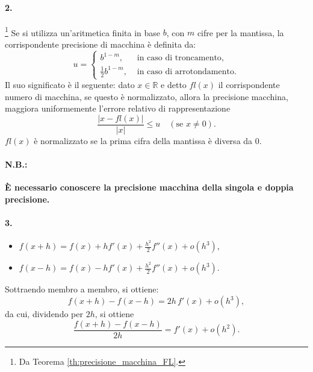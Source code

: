 \paragraph{2.} \footnote{Da Teorema \ref{th:precisione_macchina_FL}.} Se si utilizza un'aritmetica finita in base $b$, con $m$ cifre per la mantissa, la corrispondente precisione di macchina è definita da:
\begin{equation*}
	u=
	\begin{cases}
		b^{1-m}, &\text{ in caso di troncamento},\\
		\frac{1}{2}b^{1-m}, &\text{ in caso di arrotondamento}.
	\end{cases}
\end{equation*}
Il suo significato è il seguente: dato $x\in\mathbb R$ e detto $fl(x)$ il corrispondente numero di macchina, se questo è normalizzato, allora la precisione macchina, maggiora uniformemente l'errore relativo di rappresentazione
\begin{equation*}
	\frac{|x-fl(x)|}{|x|}\leq u\quad (\text{se } x\neq 0).
\end{equation*}
$fl(x)$ è normalizzato se la prima cifra della mantissa è diversa da 0.

\paragraph{N.B.:} \textbf{È necessario conoscere la precisione macchina della singola e doppia precisione.}

\paragraph{3.}
\begin{itemize}
	\item $f(x+h)=f(x)+hf'(x)+\frac{h^2}{2}f''(x)+o(h^3)$,
	\item $f(x-h)=f(x)-hf'(x)+\frac{h^2}{2}f''(x)+o(h^3)$.
\end{itemize}
Sottraendo membro a membro, si ottiene:
\begin{equation*}
	f(x+h)-f(x-h)=2h\,f'(x)+o(h^3),
\end{equation*}
da cui, dividendo per $2h$, si ottiene
\begin{equation*}
	\frac{f(x+h)-f(x-h)}{2h}=f'(x)+o(h^2).
\end{equation*}

